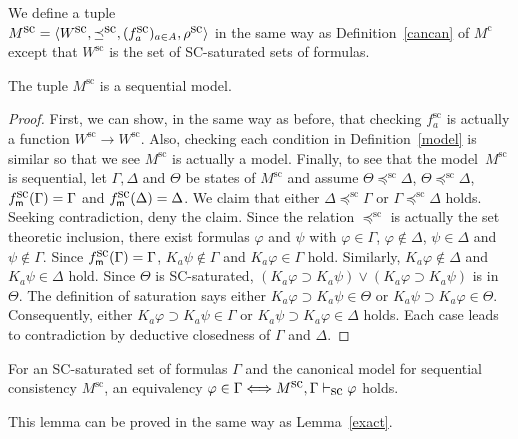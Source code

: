\renewcommand{\canon}[1]{#1^{\mbox{sc}}}
\begin{definition}
 We define a tuple\\ $\canon M =\model{^{\mbox{\rm sc}}}$ in the same
 way as Definition~\ref{cancan} of $M^{\mbox{c}}$ except that 
 $\canon W$ is the set of SC-saturated sets of formulas.
\end{definition}

\begin{lemma}
The tuple $\canon M$ is a sequential model.
\end{lemma}
\begin{proof}
First, we can show, in the same way as before,
 that checking $\canon f_a$ is actually a function $\canon
 W\rightarrow \canon W$.
Also, checking each condition in Definition~\ref{model} is similar so that we see $\canon
 M$ is actually a model.
 Finally, to see that the model~$\canon M$ is sequential,
 let $\Gamma, \Delta$ and $\Theta$ be states of $\canon M$ and assume
 $\Theta\canon\preceq\Delta$, $\Theta \canon\preceq \Delta$, $\canon f_\memory(\Gamma) = \Gamma$ and
 $\canon f_\memory(\Delta) = \Delta$.
 We claim that either $\Delta\canon\preceq \Gamma$ or $\Gamma\canon\preceq \Delta$ holds.
 Seeking contradiction, deny the claim.
 Since the relation $\canon \preceq$ is actually the set theoretic inclusion, there exist
 formulas $\varphi$ and $\psi$ with $\varphi\in\Gamma$, $\varphi\notin\Delta$, $\psi\in
 \Delta$ and $\psi\notin \Gamma$.
 Since $\canon f_\memory(\Gamma) = \Gamma$,
 $K_a\psi\notin\Gamma$ and $K_a\varphi\in \Gamma$ hold.
 Similarly,
 $K_a\varphi\notin\Delta$ and $K_a\psi\in\Delta$ hold.
 Since $\Theta$ is SC-saturated, $(K_a\varphi\supset K_a\psi)\vee (K_a\varphi\supset
 K_a\psi)$ is in $\Theta$.
 The definition of saturation says either
 $K_a\varphi\supset K_a\psi\in \Theta$ or
 $K_a\psi\supset K_a\varphi\in\Theta$.
 Consequently, either $K_a\varphi\supset K_a\psi\in\Gamma$ or
 $K_a\psi\supset K_a\varphi\in\Delta$ holds.
 Each case leads to contradiction by deductive closedness of $\Gamma$ and
 $\Delta$.
\end{proof}

\begin{lemma}
\label{sc-exact}
 For an SC-saturated set of formulas $\Gamma$ and the canonical model for sequential
 consistency
$\canon M$,
 an equivalency $\varphi\in\Gamma\Longleftrightarrow \canon M, \Gamma\vdashsc\varphi$ holds.
\end{lemma}
\noindent This lemma can be proved in the same way as Lemma~\ref{exact}.

